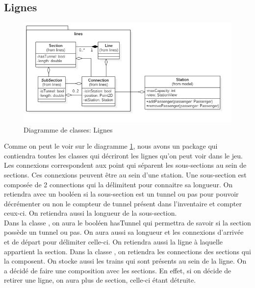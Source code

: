\documentclass[report, backcover, french, nodocumentinfo]{upmethodology-document}
\begin{document}
			\subsection{Lignes}
				\begin{figure}[h!]
					\centering
					\includegraphics[width=1\textwidth]{figures/LinesClassDiagram}
					\caption{Diagramme de classes: Lignes}
					\label{fig:LinesClassDiagram}
				\end{figure}
					Comme on peut le voir sur le diagramme \ref{fig:LinesClassDiagram}, nous avons un package  qui contiendra toutes les classes qui décriront les lignes qu'on peut voir dans le jeu. Les connexions correspondent aux point qui séparent les sous-sections au sein de sections. Ces connexions peuvent être au sein d'une station.
					Une sous-section est composée de 2 connections qui la délimitent pour connaitre sa longueur. On retiendra avec un booléen si la sous-section est un tunnel ou pas pour pouvoir décrémenter ou non le compteur de tunnel présent dans l'inventaire et compter ceux-ci. On retiendra aussi la longueur de la sous-section.\\
					Dans la classe , on aura le booléen hasTunnel qui permettra de savoir si la section possède un tunnel ou pas. On aura aussi sa longueur et les connexions d'arrivée et de départ pour délimiter celle-ci. On retiendra aussi la ligne à laquelle appartient la section.
					Dans la classe , on retiendra les connections des sections qui la composent. On stocke aussi les trains qui sont présents au sein de la ligne. On a décidé de faire une composition avec les sections. En effet, si on décide de retirer une ligne, on aura plus de section, celle-ci étant détruite.
\end{document}
